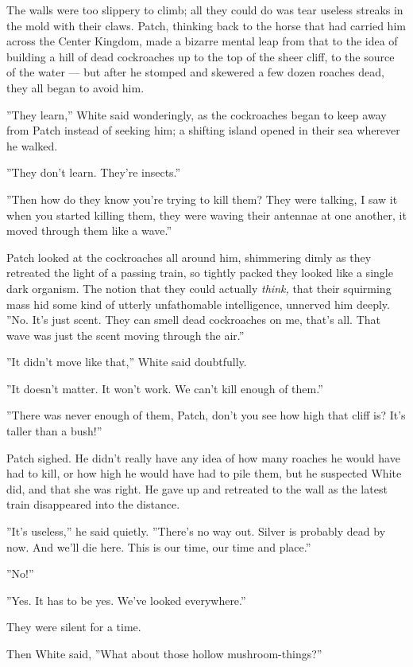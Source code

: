 \documentclass[12pt]{book}
\begin{document}
The walls were too slippery to climb; all they could do was tear
useless streaks in the mold with their claws. Patch, thinking back to
the horse that had carried him across the Center Kingdom, made a
bizarre mental leap from that to the idea of building a hill of dead
cockroaches up to the top of the sheer cliff, to the source of the
water --- but after he stomped and skewered a few dozen roaches dead,
they all began to avoid him.

''They learn,'' White said wonderingly, as the cockroaches began to
keep away from Patch instead of seeking him; a shifting island opened
in their sea wherever he walked.

''They don't learn. They're insects.''

''Then how do they know you're trying to kill them? They were talking,
I saw it when you started killing them, they were waving their
antennae at one another, it moved through them like a wave.''

Patch looked at the cockroaches all around him, shimmering dimly as
they retreated the light of a passing train, so tightly packed they
looked like a single dark organism. The notion that they could
actually \textit{think,} that their squirming mass hid some kind of
utterly unfathomable intelligence, unnerved him deeply. ''No. It's
just scent. They can smell dead cockroaches on me, that's all. That
wave was just the scent moving through the air.''

''It didn't move like that,'' White said doubtfully.

''It doesn't matter. It won't work. We can't kill enough of them.''

''There was never enough of them, Patch, don't you see how high that
cliff is? It's taller than a bush!''

Patch sighed. He didn't really have any idea of how many roaches he
would have had to kill, or how high he would have had to pile them,
but he suspected White did, and that she was right. He gave up and
retreated to the wall as the latest train disappeared into the
distance.

''It's useless,'' he said quietly. ''There's no way out. Silver is
probably dead by now. And we'll die here. This is our time, our time
and place.''

''No!''

''Yes. It has to be yes. We've looked everywhere.''

They were silent for a time.

Then White said, ''What about those hollow mushroom-things?''
\end{document}
